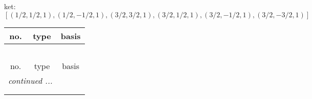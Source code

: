 \documentclass[fleqn,8pt,landscape]{jsarticle}
\begin{document}
\noindent
ket: $[(1/2,1/2,1),(1/2,-1/2,1),(3/2,3/2,1),(3/2,1/2,1),(3/2,-1/2,1),(3/2,-3/2,1)]$
\begin{center}
\renewcommand{\arraystretch}{1.6}
\begin{longtable}{ccc}
 \hline \hline
no. & type & basis \\ \hline \endfirsthead

\multicolumn{2}{l}{\tablename\ \thetable{}} \\
 \hline \hline
no. & type & basis \\ \hline \endhead

 \hline \hline
\multicolumn{2}{r}{\footnotesize\it continued ...} \\ \endfoot

 \hline \hline
\multicolumn{2}{r}{} \\ \endlastfoot


\end{longtable}
\end{center}
\end{document}
